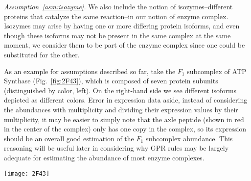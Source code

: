 \emph{Assumption~\ref{asm:isozyme}.} We also include the notion of
isozymes--different proteins that catalyze the same reaction--in our
notion of enzyme complex. Isozymes may arise by having one or more
differing protein isoforms, and even though these isoforms may not be
present in the same complex at the same moment, we consider them to be
part of the enzyme complex since one could be substituted for the
other.

As an example for assumptions described so far, take the $F_1$
subcomplex of ATP Synthase (Fig.~\ref{fig:2F43}), which is composed
of seven protein subunits (distinguished by color, left). On the
right-hand side we see different isoforms depicted as different
colors.  Error in expression data aside, instead of considering the
abundances with multiplicity and dividing their expression values by
their multiplicity, it may be easier to simply note that the axle
peptide (shown in red in the center of the complex) only has one copy
in the complex, so its expression should be an overall good estimation
of the $F_1$ subcomplex abundance. This reasoning will be useful
later in considering why GPR rules may be largely adequate for estimating
the abundance of most enzyme complexes.

\begin{figure*}%
\centering
\texttt{[image: 2F43]}
\caption{Illustration of the $F_1$ part of the ATP Synthase complex
  (PDB ID 1E79; \citealt{Gibbons2000,Bernstein1978,Gezelter}).
  This illustration demonstrates both how an enzyme complex may be
  constituted by multiple subunits (left), and how some of those
  subunits may be products of the same gene and have differing
  stoichiometries within the complex (right).}
\label{fig:2F43}
\end{figure*}


